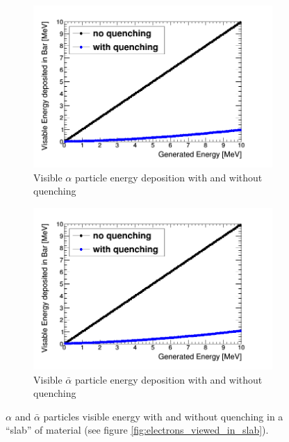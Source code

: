 \begin{figure}[!h]
\centering
\begin{subfigure}{.5\textwidth}
  \centering
  \includegraphics[width=\linewidth]{quench_eng_Alpha.png}
  \captionsetup{width=.9\linewidth}
  \caption{Visible $\alpha$ particle energy deposition with and without quenching}
  \label{subFig:alpha_quenched_and_not}
\end{subfigure}%
\begin{subfigure}{.5\textwidth}
  \centering
  \includegraphics[width=\linewidth]{quench_eng_AAlpha.png}
  \captionsetup{width=.9\linewidth}
  \caption{Visible $\bar{\alpha}$ particle energy deposition with and without quenching}
  \label{subFig:Aalpha_quenched_and_not}
\end{subfigure}
\caption{$\alpha$ and $\bar{\alpha}$ particles visible energy with and without quenching in a ``slab'' of material (see figure \ref{fig:electrons_viewed_in_slab}).}
\label{fig:alpha_Aalpha_quenched_and_not}
\end{figure}

